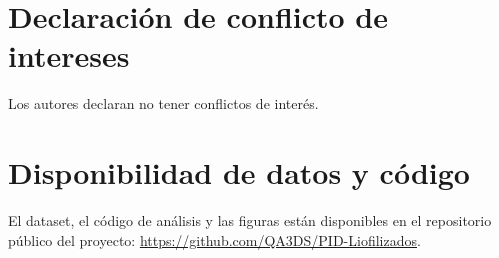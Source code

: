 \documentclass[12pt, a4paper]{article}
\begin{document}
\section*{Declaración de conflicto de intereses}

Los autores declaran no tener conflictos de interés.

\section*{Disponibilidad de datos y código}

El dataset, el código de análisis y las figuras están disponibles en el repositorio público del proyecto: \url{https://github.com/QA3DS/PID-Liofilizados}.



\end{document}
